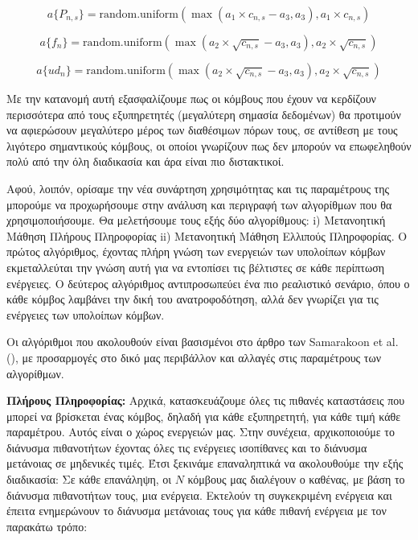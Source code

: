 \[a\{P_{n,s}\} = \text{random.uniform}\left(\max\left(a_1 \times c_{n,s} - a_3, a_3\right), a_1 \times c_{n,s}\right)\]

\[a\{f_n\} = \text{random.uniform}\left(\max\left(a_2 \times \sqrt{c_{n,s}} - a_3, a_3\right), a_2 \times \sqrt{c_{n,s}}\right)\]

\[a\{ud_n\} = \text{random.uniform}\left(\max\left(a_2 \times \sqrt{c_{n,s}} - a_3, a_3\right), a_2 \times \sqrt{c_{n,s}}\right)\]

\noindent
Με την κατανομή αυτή εξασφαλίζουμε πως οι κόμβους που έχουν να κερδίζουν περισσότερα από τους εξυπηρετητές (μεγαλύτερη σημασία δεδομένων) θα προτιμούν να αφιερώσουν μεγαλύτερο μέρος των διαθέσιμων πόρων τους, σε αντίθεση με τους λιγότερο σημαντικούς κόμβους, οι οποίοι γνωρίζουν πως δεν μπορούν να επωφεληθούν πολύ από την όλη διαδικασία και άρα είναι πιο διστακτικοί.

Αφού, λοιπόν, ορίσαμε την νέα συνάρτηση χρησιμότητας και τις παραμέτρους της μπορούμε να προχωρήσουμε στην ανάλυση και περιγραφή των αλγορίθμων που θα χρησιμοποιήσουμε. Θα μελετήσουμε τους εξής δύο αλγορίθμους: i) Μετανοητική Μάθηση Πλήρους Πληροφορίας ii) Μετανοητική Μάθηση Ελλιπούς Πληροφορίας. Ο πρώτος αλγόριθμος, έχοντας πλήρη γνώση των ενεργειών των υπολοίπων κόμβων εκμεταλλεύται την γνώση αυτή για να εντοπίσει τις βέλτιστες σε κάθε περίπτωση ενέργειες. Ο δεύτερος αλγόριθμος αντιπροσωπεύει ένα πιο ρεαλιστικό σενάριο, όπου ο κάθε κόμβος λαμβάνει την δική του ανατροφοδότηση, αλλά δεν γνωρίζει για τις ενέργειες των υπολοίπων κόμβων.

Οι αλγόριθμοι που ακολουθούν είναι βασισμένοι στο άρθρο των Samarakoon et al. (), με προσαρμογές στο δικό μας περιβάλλον και αλλαγές στις παραμέτρους των αλγορίθμων.

\textbf{Πλήρους Πληροφορίας:} Αρχικά, κατασκευάζουμε όλες τις πιθανές καταστάσεις που μπορεί να βρίσκεται ένας κόμβος, δηλαδή για κάθε εξυπηρετητή, για κάθε τιμή κάθε παραμέτρου. Αυτός είναι ο χώρος ενεργειών μας. Στην συνέχεια, αρχικοποιούμε το διάνυσμα πιθανοτήτων έχοντας όλες τις ενέργειες ισοπίθανες και το διάνυσμα μετάνοιας σε μηδενικές τιμές. Έτσι ξεκινάμε επαναληπτικά να ακολουθούμε την εξής διαδικασία: Σε κάθε επανάληψη, οι $N$ κόμβους μας διαλέγουν ο καθένας, με βάση το διάνυσμα πιθανοτήτων τους, μια ενέργεια. Εκτελούν τη συγκεκριμένη ενέργεια και έπειτα ενημερώνουν το διάνυσμα μετάνοιας τους για κάθε πιθανή ενέργεια με τον παρακάτω τρόπο:

\vspace{-5pt}

